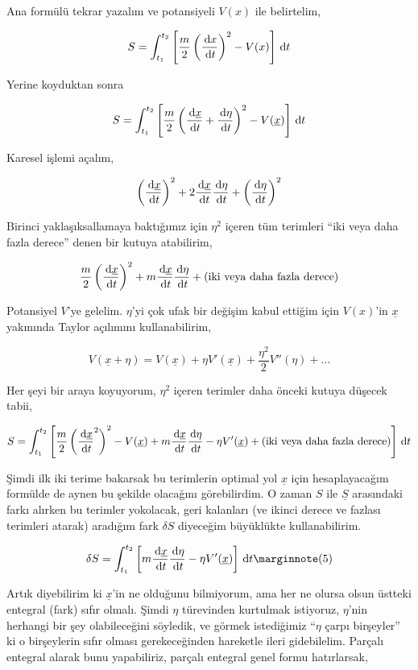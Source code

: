 \documentclass[12pt,fleqn]{article}\usepackage{../../common}
\begin{document}
Ana formülü tekrar yazalım ve potansiyeli $V(x)$ ile belirtelim,

$$ 
S = \int_{t_1}^{t_2} 
\left[ 
\frac{m}{2} \left( \frac{\,\mathrm{d} x}{\,\mathrm{d} t} \right)^2 - V(x)
\right] \,\mathrm{d} t
$$

Yerine koyduktan sonra

$$ 
S = \int_{t_1}^{t_2} 
\left[ 
  \frac{m}{2} 
   \left(  \frac{\,\mathrm{d} \underline{x}}{\,\mathrm{d} t} + \frac{\,\mathrm{d} \eta}{\,\mathrm{d} t} \right)^2 - 
   V(\underline{x})
\right] \,\mathrm{d} t
$$

Karesel işlemi açalım, 

$$ 
\left( \frac{\,\mathrm{d} \underline{x}}{\,\mathrm{d} t}\right)^2 + 
2 \frac{\,\mathrm{d} \underline{x}}{\,\mathrm{d} t} \frac{\,\mathrm{d} \eta}{\,\mathrm{d} t} +
\left( \frac{\,\mathrm{d} \eta}{\,\mathrm{d} t}\right)^2
$$

Birinci yaklaşıksallamaya baktığımız için $\eta^2$ içeren tüm terimleri
``iki veya daha fazla derece'' denen bir kutuya atabilirim, 

$$ 
\frac{m}{2} \left( \frac{\,\mathrm{d} \underline{x}}{\,\mathrm{d} t}\right)^2 + 
m \frac{\,\mathrm{d} \underline{x}}{\,\mathrm{d} t} \frac{\,\mathrm{d} \eta}{\,\mathrm{d} t} + 
(\textrm{iki veya daha fazla derece})
$$

Potansiyel $V$'ye gelelim. $\eta$'yi çok ufak bir değişim kabul ettiğim
için $V(x)$'in $\underline{x}$ yakınında Taylor açılımını kullanabilirim, 

$$ 
V(\underline{x} + \eta) = 
V(\underline{x}) + \eta V'(\underline{x}) + 
\frac{\eta^2}{2}V''(\eta) + ...
$$

Her şeyi bir araya koyuyorum, $\eta^2$ içeren terimler daha önceki kutuya
düşecek tabii, 

$$ 
S = \int_{t_1}^{t_2} \left[
\frac{m}{2} \left( \frac{\,\mathrm{d} \underline{x}}{\,\mathrm{d} t}^2 \right)^2
- V(\underline{x}) 
+ m \frac{\,\mathrm{d} \underline{x}}{\,\mathrm{d} t} \frac{\,\mathrm{d} \eta}{\,\mathrm{d} t} 
- \eta V'(\underline{x}) + (\textrm{iki veya daha fazla derece})
\right] \,\mathrm{d} t 
$$

Şimdi ilk iki terime bakarsak bu terimlerin optimal yol $\underline{x}$
için hesaplayacağım formülde de aynen bu şekilde olacağını görebilirdim. O
zaman $S$ ile $\underline{S}$ arasındaki farkı alırken bu terimler
yokolacak, geri kalanları (ve ikinci derece ve fazlası terimleri atarak)
aradığım fark $\delta S$ diyeceğim büyüklükte kullanabilirim.

$$ 
\delta S = \int_{t_1}^{t_2} \left[ 
m \frac{\ud\underline{x}}{\ud t} \frac{\ud\eta}{\ud t} - \eta V'(\underline{x})
\right] \ud t 
\mlabel{5}
$$

Artık diyebilirim ki $\underline{x}$'in ne olduğunu bilmiyorum, ama her ne
olursa olsun üstteki entegral (fark) sıfır olmalı. Şimdi $\eta$ türevinden
kurtulmak istiyoruz, $\eta$'nin herhangi bir şey olabileceğini söyledik, ve
görmek istediğimiz ``$\eta$ çarpı birşeyler'' ki o birşeylerin sıfır olması
gerekeceğinden hareketle ileri gidebilelim. Parçalı entegral alarak bunu
yapabiliriz, parçalı entegral genel formu hatırlarsak,
\end{document}
